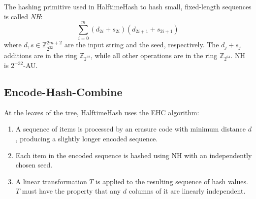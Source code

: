 \documentclass[runningheads]{llncs}
\newcommand{\ints}{\mathbb{Z}}
\begin{document}
The hashing primitive used in HalftimeHash to hash small, fixed-length sequences is called {\em NH}: \cite{umac}
\[
\sum_{i=0}^m (d_{2i} + s_{2i})(d_{2i+1} + s_{2i+1})
\]
where $d, s \in \ints_{2^{32}}^{2m+2}$ are the input string and the seed, respectively.
The $d_j + s_j$ additions are in the ring $\ints_{2^{32}}$, while all other operations are in the ring $\ints_{2^{64}}$.
NH is $2^{-32}$-AU.







\subsection{Encode-Hash-Combine}

At the leaves of the tree, HalftimeHash uses the EHC algorithm: \cite{ehc-nandi}

\begin{enumerate}
\item A sequence of items is processed by an erasure code with minimum distance $d$, producing a slightly longer encoded sequence.
\item Each item in the encoded sequence is hashed using NH with an independently chosen seed.
\item A linear transformation $T$ is applied to the resulting sequence of hash values.
  $T$ must have the property that any $d$ columns of it are linearly independent.
\end{enumerate}

\end{document}
